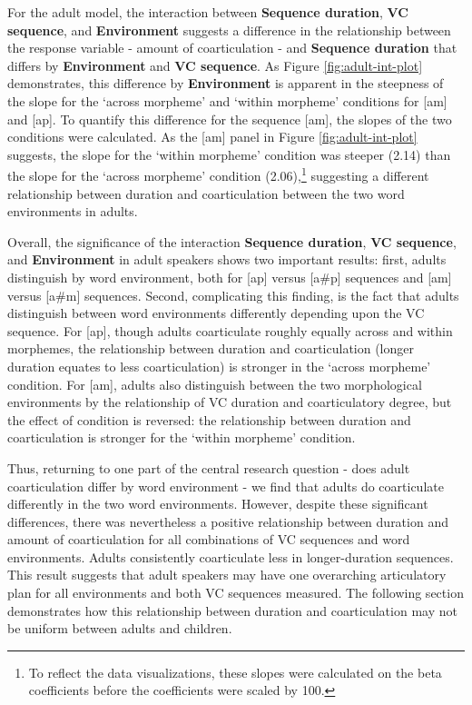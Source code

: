 \documentclass[
]{article}
\begin{document}
For the adult model, the interaction between \textbf{Sequence duration}, \textbf{VC sequence}, and \textbf{Environment} suggests a difference in the relationship between the response variable - amount of coarticulation - and \textbf{Sequence duration} that differs by \textbf{Environment} and \textbf{VC sequence}. As Figure \ref{fig:adult-int-plot} demonstrates, this difference by \textbf{Environment} is apparent in the steepness of the slope for the `across morpheme' and `within morpheme' conditions for {[}am{]} and {[}ap{]}. To quantify this difference for the sequence {[}am{]}, the slopes of the two conditions were calculated. As the {[}am{]} panel in Figure \ref{fig:adult-int-plot} suggests, the slope for the `within morpheme' condition was steeper (2.14) than the slope for the `across morpheme' condition (2.06),\footnote{To reflect the data visualizations, these slopes were calculated on the beta coefficients before the coefficients were scaled by 100.} suggesting a different relationship between duration and coarticulation between the two word environments in adults.

Overall, the significance of the interaction \textbf{Sequence duration}, \textbf{VC sequence}, and \textbf{Environment} in adult speakers shows two important results: first, adults distinguish by word environment, both for {[}ap{]} versus {[}a\#p{]} sequences and {[}am{]} versus {[}a\#m{]} sequences. Second, complicating this finding, is the fact that adults distinguish between word environments differently depending upon the VC sequence. For {[}ap{]}, though adults coarticulate roughly equally across and within morphemes, the relationship between duration and coarticulation (longer duration equates to less coarticulation) is stronger in the `across morpheme' condition. For {[}am{]}, adults also distinguish between the two morphological environments by the relationship of VC duration and coarticulatory degree, but the effect of condition is reversed: the relationship between duration and coarticulation is stronger for the `within morpheme' condition.

Thus, returning to one part of the central research question - does adult coarticulation differ by word environment - we find that adults do coarticulate differently in the two word environments. However, despite these significant differences, there was nevertheless a positive relationship between duration and amount of coarticulation for all combinations of VC sequences and word environments. Adults consistently coarticulate less in longer-duration sequences. This result suggests that adult speakers may have one overarching articulatory plan for all environments and both VC sequences measured. The following section demonstrates how this relationship between duration and coarticulation may not be uniform between adults and children.
\end{document}

